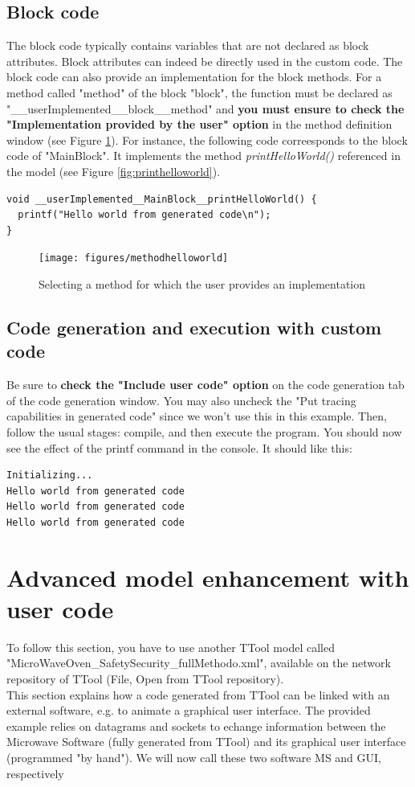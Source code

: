 \documentclass[12pt]{article}
\begin{document}
\subsection{Block code}
The block code typically contains variables that are not declared as block attributes. Block attributes can indeed be directly used in the custom code. The block code can also provide an implementation for the block methods. For a method called "method" of the block "block", the function must be declared as "\_\_userImplemented\_\_block\_\_method" and \textbf{you must ensure to check the "Implementation provided by the user" option} in the method definition window (see Figure \ref{fig:methodhelloworld}). For instance, the following code correesponds to the block code of "MainBlock". It implements the method \textit{printHelloWorld()} referenced in the model (see Figure \ref{fig:printhelloworld}).
\begin{lstlisting}
void __userImplemented__MainBlock__printHelloWorld() {
  printf("Hello world from generated code\n");
}
\end{lstlisting}

\begin{figure}[htbp]
\centering
\texttt{[image: figures/methodhelloworld]}
\caption{Selecting a method for which the user provides an implementation}\label{fig:methodhelloworld}
\end{figure}

\subsection{Code generation and execution with custom code}

Be sure to \textbf{check the "Include user code" option} on the code generation tab of the code generation window. You may also uncheck the "Put tracing capabilities in generated code" since we won't use this in this example. Then, follow the usual stages: compile, and then execute the program. You should now see the effect of the printf command in the console. It should like this:
\begin{lstlisting}
Initializing...
Hello world from generated code
Hello world from generated code
Hello world from generated code
\end{lstlisting}

\newpage
\section{Advanced model enhancement with user code}\label{sec:advanced}
To follow this section, you have to use another TTool model called "MicroWaveOven\_SafetySecurity\_fullMethodo.xml", available on the network repository of TTool (File, Open from TTool repository).\\
This section explains how a code generated from TTool can be linked with an external software, e.g. to animate a graphical user interface. The provided example relies on datagrams and sockets to echange information between the Microwave Software (fully generated from TTool) and its graphical user interface (programmed "by hand"). We will now call these two software MS and GUI, respectively
\end{document}
